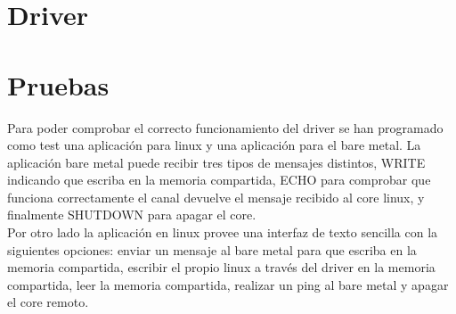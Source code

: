 \documentclass[11pt]{article}
\begin{document}
\section{Driver}

\section{Pruebas}
Para poder comprobar el correcto funcionamiento del driver se han programado como test una aplicación para linux y una aplicación para el bare metal. La aplicación bare metal puede recibir tres tipos de mensajes distintos, WRITE indicando que escriba en la memoria compartida, ECHO para comprobar que funciona correctamente el canal devuelve el mensaje recibido al core linux, y finalmente SHUTDOWN para apagar el core.\\

\noindent Por otro lado la aplicación en linux provee una interfaz de texto sencilla con la siguientes opciones: enviar un mensaje al bare metal para que escriba en la memoria compartida, escribir el propio linux a través del driver en la memoria compartida, leer la memoria compartida, realizar un ping al bare metal y apagar el core remoto.\\
\end{document}
